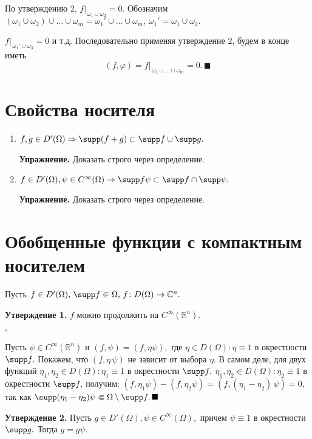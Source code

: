 \documentclass[unicode,12pt,draft]{article}
\begin{document}
По утверждению 2, $f|_{\,\omega_1\cup\omega_2}=0.$ Обозначим
$(\omega_1\cup\omega_2)\cup\ldots\cup\omega_m={\omega_1}'\cup\ldots\cup\omega_m,\,{\omega_1}'=\omega_1\cup\omega_2.
$

$f|_{\,{\omega_1}'\cup\omega_3}=0$ и т.д. Последовательно применяя
утверждение 2, будем в конце иметь
$$(f,\varphi)=f|_{\,\omega_1\cup\ldots\cup\omega_m}=0.\,\blacksquare$$



\section{Свойства носителя}

\begin{enumerate}
\item $f,g\in D' (\Omega) \Rightarrow \supp (f+g)\subset \supp f\cup
\supp g.$

\textbf{Упражнение.} Доказать строго через определение.
\item $f\in D' (\Omega), \psi\in C^{\infty}(\Omega) \Rightarrow \supp f\psi\subset \supp f\cap
\supp \psi.$

\textbf{Упражнение.} Доказать строго через определение.
\end{enumerate}

\section{Обобщенные функции с компактным носителем}

Пусть $f\in D' (\Omega),\, \supp f\Subset\Omega,\, f\colon
D(\Omega)\to \mathbb C^n.$

\textbf{Утверждение 1.} $f$ можно продолжить на
$C^{\infty}(\mathbb R^n).$

$\square$

Пусть $\psi\in C^{\infty}(\mathbb R^n)$ и $(f,\psi)=(f,\eta\psi),$
где $\eta\in D(\Omega)\colon \eta\equiv1$ в окрестности $\supp f.$
Покажем, что $(f,\eta\,\psi)$ не зависит от выбора $\eta.$ В самом
деле, для двух функций $\eta_1,\eta_2\in D(\Omega)\colon
\eta_1\equiv1$ в окрестности $\supp f,$ $\eta_1,\eta_2\in
D(\Omega)\colon \eta_2\equiv1$ в окрестности $\supp f,$ получим:
$(f,\eta_1\psi)-(f,\eta_2\psi)=(f,(\eta_1-\eta_2)\,\psi)=0,$ так
как $\supp (\eta_1-\eta_2)\psi\Subset\Omega\setminus \supp f.
\,\blacksquare$

\textbf{Утверждение 2.} Пусть $g\in D' (\Omega), \psi\in
C^{\infty}(\Omega),$ причем $\psi \equiv1$ в окрестности $\supp
g.$ Тогда $g=g\psi.$
\end{document}
